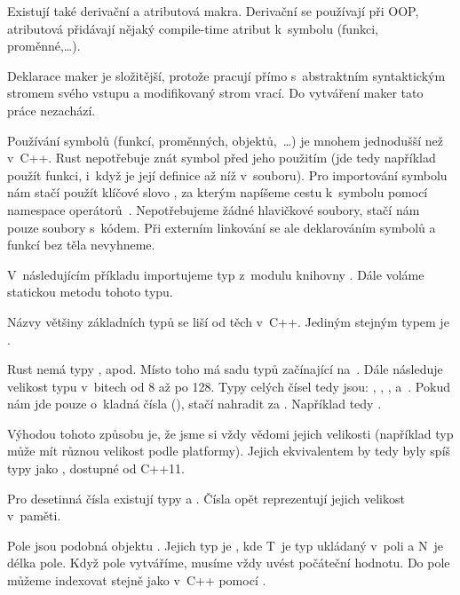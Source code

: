 \documentclass[main.tex]{subfiles}
\begin{document}
Existují také derivační a atributová makra. Derivační se používají při OOP, atributová
přidávají nějaký compile-time atribut k~symbolu (funkci, proměnné,\dots).

Deklarace maker je složitější, protože pracují přímo s~abstraktním syntaktickým stromem
svého vstupu a modifikovaný strom vrací. Do vytváření maker tato práce nezachází.


Používání symbolů (funkcí, proměnných, objektů,~\dots) je mnohem jednodušší než v~C++.
Rust nepotřebuje znát symbol před jeho použitím (jde tedy například použít funkci, i~když
je její definice až níž v~souboru). Pro importování symbolu nám stačí použít klíčové slovo
, za kterým napíšeme cestu k~symbolu pomocí namespace operátorů~\irust{::}.
Nepotřebujeme žádné hlavičkové soubory, stačí nám pouze soubory s~kódem. Při externím
linkování se ale deklarováním symbolů a funkcí bez těla nevyhneme.

V~následujícím příkladu importujeme typ  z~modulu 
knihovny . Dále voláme statickou metodu  tohoto typu.

\obrazek
{}


Názvy většiny základních typů se liší od těch v~C++. Jediným stejným typem je
.


Rust nemá typy ,  apod. Místo toho má sadu typů začínající
na~. Dále následuje velikost typu v~bitech od 8 až po 128. Typy celých čísel tedy
jsou: , , ,  a~. Pokud nám jde
pouze o~kladná čísla (), stačí nahradit  za . Například
tedy .

Výhodou tohoto způsobu je, že jsme si vždy vědomi jejich velikosti (například typ
 může mít různou velikost podle platformy). Jejich ekvivalentem by tedy byly
spíš typy jako , dostupné od C++11.

Pro desetinná čísla existují typy  a . Čísla opět reprezentují
jejich velikost v~paměti.


Pole jsou podobná objektu . Jejich typ je \irust{[T; N]}, kde T~je typ
ukládaný v~poli a N~je délka pole. Když pole vytváříme, musíme vždy uvést počáteční
hodnotu. Do pole můžeme indexovat stejně jako v~C++ pomocí \icpp{[]}.
\end{document}

